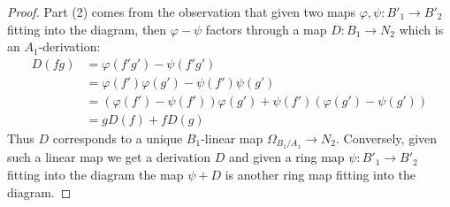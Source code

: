\documentclass[10pt,a4paper]{amsart}
\theoremstyle{plain}
\theoremstyle{definition}
\theoremstyle{remark}
\numberwithin{equation}{subsection}
\begin{document}
\begin{proof}
\medskip\noindent
Part (2) comes from the observation that given two maps
$\varphi, \psi : B'_1 \to B'_2$ fitting into the diagram, then
$\varphi - \psi$ factors through a map $D : B_1 \to N_2$ which
is an $A_1$-derivation:
\begin{align*}
D(fg) & = \varphi(f'g') - \psi(f'g') \\
& =
\varphi(f')\varphi(g') - \psi(f')\psi(g') \\
& =
(\varphi(f') - \psi(f'))\varphi(g') + \psi(f')(\varphi(g') - \psi(g')) \\
& =
gD(f) + fD(g)
\end{align*}
Thus $D$ corresponds to a unique $B_1$-linear map
$\Omega_{B_1/A_1} \to N_2$. Conversely, given such a linear map
we get a derivation $D$ and given a ring map $\psi : B'_1 \to B'_2$
fitting into the diagram
the map $\psi + D$ is another ring map fitting into the diagram.
\end{proof}
\end{document}
